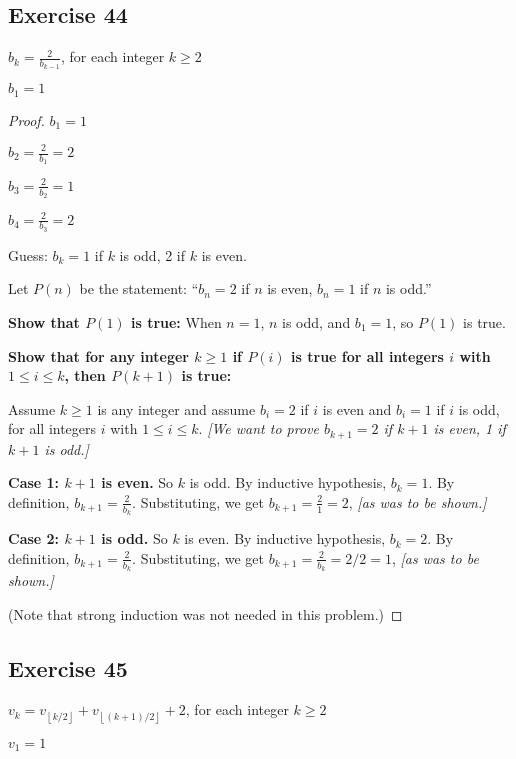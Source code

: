 \documentclass[14pt]{extarticle}
\newcommand{\dps}{\displaystyle}
\newcommand{\floor}[1]{{\left\lfloor#1\right\rfloor}}
\begin{document}
\subsection{Exercise 44}
\(b_k = \dps \frac{2}{b_{k-1}}\), for each integer \(k \geq 2\)

\(b_1 = 1\)

\begin{proof}
    \(b_1 = 1\)

    \(b_2 = \dps\frac{2}{b_1} = 2\)

    \(b_3 = \dps\frac{2}{b_2} = 1\)

    \(b_4 = \dps\frac{2}{b_3} = 2\)

    Guess: \(b_k = 1\) if $k$ is odd, 2 if $k$ is even.

    Let $P(n)$ be the statement: ``\(b_n = 2\) if $n$ is even, \(b_n = 1\) if $n$ is odd.''

    {\bf Show that $P(1)$ is true:} When $n = 1$, $n$ is odd, and $b_1 = 1$, so $P(1)$ is true.

        {\bf Show that for any integer \(k \geq 1\) if $P(i)$ is true for all integers $i$ with \(1 \leq i \leq k\), then
            $P(k+1)$ is true:}

    Assume \(k \geq 1\) is any integer and assume \(b_i = 2\) if $i$ is even and \(b_i = 1\) if $i$ is odd,
    for all integers $i$ with \(1 \leq i \leq k\). {\it [We want to prove \(b_{k+1} = 2\) if $k+1$ is even, 1 if
                $k+1$ is odd.]}

        {\bf Case 1: $k+1$ is even.} So $k$ is odd. By inductive hypothesis, \(b_k = 1\).
    By definition, \(b_{k+1} = \dps \frac{2}{b_k}\).
    Substituting, we get \(b_{k+1} = \dps \frac{2}{1} = 2\), {\it [as was to be shown.]}

        {\bf Case 2: $k+1$ is odd.} So $k$ is even. By inductive hypothesis, \(b_k = 2\).
    By definition, \(b_{k+1} = \dps \frac{2}{b_k}\).
    Substituting, we get \(b_{k+1} = \dps \frac{2}{b_k} = 2/2 = 1\), {\it [as was to be shown.]}

    (Note that strong induction was not needed in this problem.)
\end{proof}

\subsection{Exercise 45}
\(\dps v_k = v_{\floor{k/2}} + v_{\floor{(k+1)/2}} + 2\), for each integer \(k \geq 2\)

\(v_1 = 1\)
\end{document}
